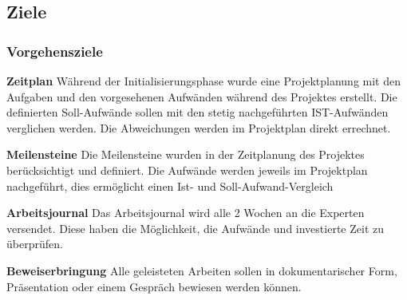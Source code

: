 \subsection{Ziele}
\subsubsection{Vorgehensziele}

\textbf{Zeitplan}
\newline
Während der Initialisierungsphase wurde eine Projektplanung mit den Aufgaben und den vorgesehenen Aufwänden während des Projektes erstellt. Die definierten Soll-Aufwände sollen mit den stetig nachgeführten IST-Aufwänden verglichen werden. Die Abweichungen werden im Projektplan direkt errechnet.

\textbf{Meilensteine}
\newline
Die Meilensteine wurden in der Zeitplanung des Projektes berücksichtigt und definiert. Die Aufwände werden jeweils im Projektplan nachgeführt, dies ermöglicht einen Ist- und Soll-Aufwand-Vergleich

\textbf{Arbeitsjournal}
\newline
Das Arbeitsjournal wird alle 2 Wochen an die Experten versendet. Diese haben die Möglichkeit, die Aufwände und investierte Zeit zu überprüfen.

\textbf{Beweiserbringung}
\newline
Alle geleisteten Arbeiten sollen in dokumentarischer Form, Präsentation oder einem Gespräch bewiesen werden können.